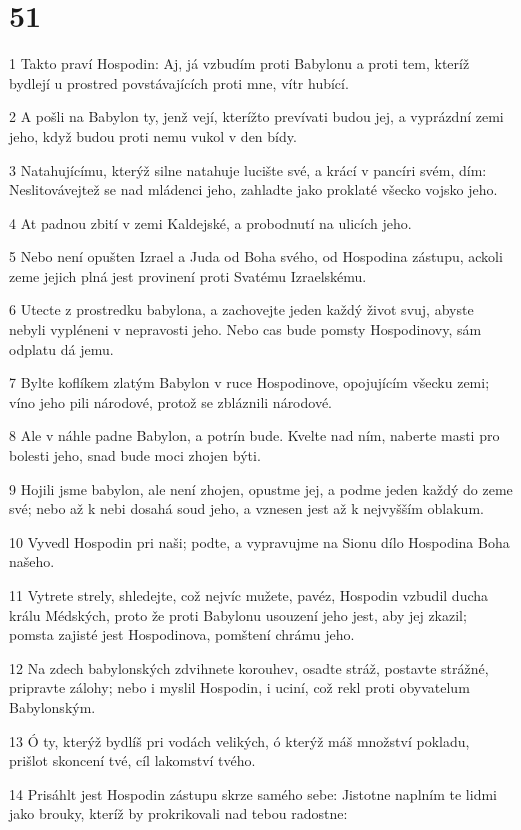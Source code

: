 \chapter{51}

\par 1 Takto praví Hospodin: Aj, já vzbudím proti Babylonu a proti tem, kteríž bydlejí u prostred povstávajících proti mne, vítr hubící.
\par 2 A pošli na Babylon ty, jenž vejí, kterížto prevívati budou jej, a vyprázdní zemi jeho, když budou proti nemu vukol v den bídy.
\par 3 Natahujícímu, kterýž silne natahuje lucište své, a krácí v pancíri svém, dím: Neslitovávejtež se nad mládenci jeho, zahladte jako proklaté všecko vojsko jeho.
\par 4 At padnou zbití v zemi Kaldejské, a probodnutí na ulicích jeho.
\par 5 Nebo není opušten Izrael a Juda od Boha svého, od Hospodina zástupu, ackoli zeme jejich plná jest provinení proti Svatému Izraelskému.
\par 6 Utecte z prostredku babylona, a zachovejte jeden každý život svuj, abyste nebyli vypléneni v nepravosti jeho. Nebo cas bude pomsty Hospodinovy, sám odplatu dá jemu.
\par 7 Bylte koflíkem zlatým Babylon v ruce Hospodinove, opojujícím všecku zemi; víno jeho pili národové, protož se zbláznili národové.
\par 8 Ale v náhle padne Babylon, a potrín bude. Kvelte nad ním, naberte masti pro bolesti jeho, snad bude moci zhojen býti.
\par 9 Hojili jsme babylon, ale není zhojen, opustme jej, a podme jeden každý do zeme své; nebo až k nebi dosahá soud jeho, a vznesen jest až k nejvyšším oblakum.
\par 10 Vyvedl Hospodin pri naši; podte, a vypravujme na Sionu dílo Hospodina Boha našeho.
\par 11 Vytrete strely, shledejte, což nejvíc mužete, pavéz, Hospodin vzbudil ducha králu Médských, proto že proti Babylonu usouzení jeho jest, aby jej zkazil; pomsta zajisté jest Hospodinova, pomštení chrámu jeho.
\par 12 Na zdech babylonských zdvihnete korouhev, osadte stráž, postavte strážné, pripravte zálohy; nebo i myslil Hospodin, i uciní, což rekl proti obyvatelum Babylonským.
\par 13 Ó ty, kterýž bydlíš pri vodách velikých, ó kterýž máš množství pokladu, prišlot skoncení tvé, cíl lakomství tvého.
\par 14 Prisáhlt jest Hospodin zástupu skrze samého sebe: Jistotne naplním te lidmi jako brouky, kteríž by prokrikovali nad tebou radostne:
